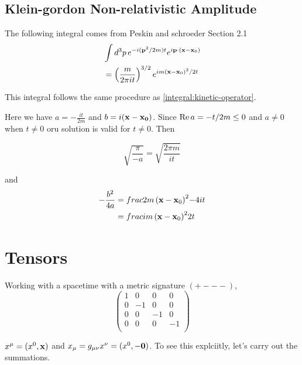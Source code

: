 
\subsection{Klein-gordon Non-relativistic Amplitude} \label{ps-kg:nonrelativistic-propagator}

The following integral comes from Peskin and schroeder Section 2.1
\begin{align}
& \int d^3p \, e^{-i(\boldsymbol{\mathbf{p}}^2/2m)t} e^{i\boldsymbol{\mathbf{p}}\cdot(\boldsymbol{\mathbf{x}}-\boldsymbol{\mathbf{x}}_0)} \label{kg:nonrelativistic-03} \\
&= \left( \frac{m}{2\pi i t} \right)^{3/2} e^{im (\boldsymbol{\mathbf{x}}-\boldsymbol{\mathbf{x}}_0)^2 /2t} \label{kg:nonrelativistic-04}
\end{align}

This integral follows the same procedure as \ref{integral:kinetic-operator}.

Here we have $a = -\frac{it}{2m}$ and $b = i(\boldsymbol{\mathbf{x}}-\boldsymbol{\mathbf{x_0}})$.
Since $\operatorname{Re}{a} = -t/2m \leq 0$ and $a\neq 0$ when $t\neq 0$ oru solution is valid for $t\neq 0$.
Then

$$
\sqrt{ \frac{\pi}{-a} } = \sqrt{ \frac{2\pi m}{it} }
$$

and
\begin{align*}
-\frac{b^2}{4a} &= frac{2m \left(\boldsymbol{\mathbf{x}}-\boldsymbol{\mathbf{x}}_0\right)^2}{-4it} \\
&= frac{im \left(\boldsymbol{\mathbf{x}}-\boldsymbol{\mathbf{x}}_0\right)^2}{2t}
\end{align*}



\section{Tensors}

Working with a spacetime with a metric signature $(+ - - -)$,
$$
\begin{pmatrix}
    1 & 0  & 0  & 0  \\
    0 & -1 & 0  & 0  \\
    0 & 0  & -1 & 0  \\
    0 & 0  & 0  & -1 \\
\end{pmatrix}
$$

$x^\mu = (x^0, \boldsymbol{\mathbf{x}})$ and $x_\mu = g_{\mu\nu} x^\nu = (x^0, -\boldsymbol{\mathbf{0}})$.
To see this explciitly, let's carry out the summations.


